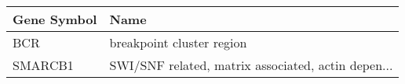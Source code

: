 \begin{tabular}{ll}
\toprule
Gene Symbol &                                               Name \\
\midrule
        BCR &                          breakpoint cluster region \\
    SMARCB1 & SWI/SNF related, matrix associated, actin depen... \\
\bottomrule
\end{tabular}
